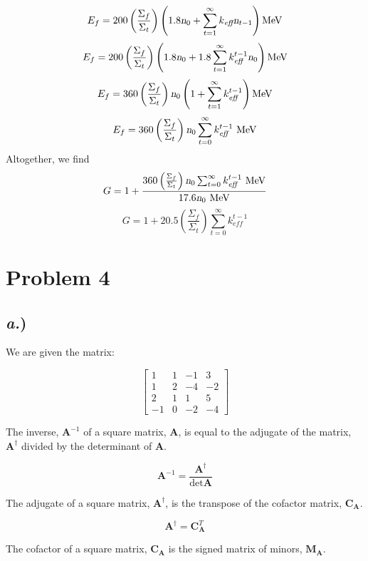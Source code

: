 \documentclass{article}
\newcommand{\Xs}{\Sigma}
\begin{document}
$$ E_f = 200 \left(\frac{\Xs_f}{\Xs_t}\right)\left(1.8\textsl{n}_0 + \sum_{t=1}^{\infty}k_{\textit{eff}}\textsl{n}_{t-1} \right) \text{MeV} $$
$$ E_f = 200 \left(\frac{\Xs_f}{\Xs_t}\right)\left(1.8\textsl{n}_0 + 1.8\sum_{t=1}^{\infty}k_{\textit{eff}}^{t-1}\textsl{n}_0 \right) \text{MeV} $$
$$ E_f = 360 \left(\frac{\Xs_f}{\Xs_t}\right)\textsl{n}_0 \left(1  + \sum_{t=1}^{\infty}k_{\textit{eff}}^{t-1} \right) \text{MeV} $$
$$ E_f = 360 \left(\frac{\Xs_f}{\Xs_t}\right)\textsl{n}_0 \sum_{t=0}^{\infty}k_{\textit{eff}}^{t-1} \text{ MeV} $$
Altogether, we find
$$ G = 1 + \frac{360 \left(\frac{\Xs_f}{\Xs_t}\right)\textsl{n}_0 \sum_{t=0}^{\infty}k_{\textit{eff}}^{t-1} \text{ MeV}}{17.6 \textsl{n}_0 \text{ MeV}} $$
$$\boxed{ G = 1 + 20.5 \left(\frac{\Xs_f}{\Xs_t}\right) \sum_{t=0}^{\infty}k_{\textit{eff}}^{t-1} }$$




\section*{Problem 4}

\subsection*{\textit{a.})}

We are given the matrix:

$$\begin{bmatrix}
1 	&	1	&	-1	&	3	\\
1	&	2	&	-4	&	-2	\\
2	&	1	&	1	&	5	\\
-1	&	0	&	-2	&	-4	\end{bmatrix}$$

The inverse, $\textbf{A}^{-1}$ of a square matrix, $\textbf{A}$,  is equal to the adjugate of the matrix, $\textbf{A}^{\dagger}$ divided by the determinant of $\textbf{A}$. 

$$ \textbf{A}^{-1} = \frac{\textbf{A}^{\dagger}}{\det{\textbf{A}}} $$

The adjugate of a square matrix, $\textbf{A}^{\dagger}$, is the transpose of the cofactor matrix, $\textbf{C}_{\textbf{A}}$.

$$ \textbf{A}^{\dagger} = \textbf{C}_{\textbf{A}}^T $$

The cofactor of a square matrix, $\textbf{C}_{\textbf{A}}$ is the signed matrix of minors, $\textbf{M}_{\textbf{A}}$.
\end{document}
